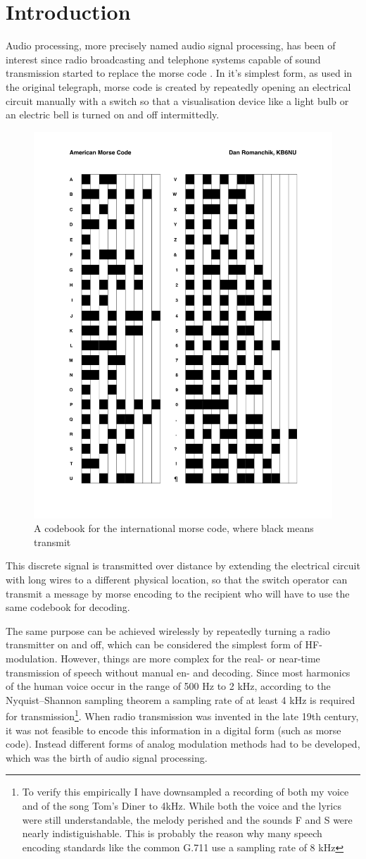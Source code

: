 \chapter{Introduction}
\label{Introduction}

Audio processing, more precisely named audio signal processing, has been of interest since radio broadcasting and telephone systems capable of sound transmission started to replace the morse code \cite{spanias2006audio}. In it's simplest form, as used in the original telegraph, morse code is created by repeatedly opening an electrical circuit manually with a switch so that a visualisation device like a light bulb or an electric bell is turned on and off intermittedly. 


\begin{figure}[H]
    \centering
	\includegraphics[width=.4\textwidth]{./images/illustrations/morse-chart}
    \caption{A codebook for the international morse code, where black means transmit}
    \label{fig:morse}
\end{figure}

This discrete signal is transmitted over distance by extending the electrical circuit with long wires to a different physical location, so that the switch operator can transmit a message by morse encoding to the recipient who will have to use the same codebook for decoding.

The same purpose can be achieved wirelessly by repeatedly turning a radio transmitter on and off, which can be considered the simplest form of HF-modulation. However, things are more complex for the real- or near-time transmission of speech without manual en- and decoding. Since most harmonics of the human voice occur in the range of 500 Hz to 2 kHz, according to the Nyquist–Shannon sampling theorem a sampling rate of at least 4 kHz is required for transmission\footnote{To verify this empirically I have downsampled a recording of both my voice and of the song Tom's Diner to 4kHz. While both the voice and the lyrics were still understandable, the melody perished and the sounds F and S were nearly indistiguishable. This is probably the reason why many speech encoding standards like the common G.711 use a sampling rate of 8 kHz}. When radio transmission was invented in the late 19th century, it was not feasible to encode this information in a digital form (such as morse code). Instead different forms of analog modulation methods had to be developed, which was the birth of audio signal processing.

